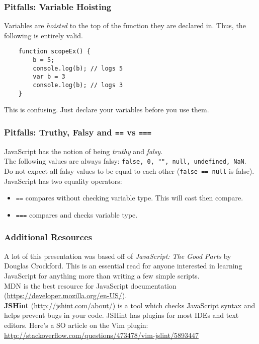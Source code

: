 \documentclass{lug}
\begin{document}
\begin{frame}[fragile]
    \frametitle{Pitfalls: Variable Hoisting}

    Variables are \textit{hoisted} to the top of the function they are declared in. Thus, the
    following is entirely valid.

    \begin{verbatim}
    function scopeEx() {
        b = 5;
        console.log(b); // logs 5
        var b = 3
        console.log(b); // logs 3
    }
    \end{verbatim}

    This is confusing. Just declare your variables before you use them.

\end{frame}

\begin{frame}
    \frametitle{Pitfalls: Truthy, Falsy and \texttt{==} vs \texttt{===}}

    JavaScript has the notion of being \textit{truthy} and \textit{falsy}.\\

    The following values are always falsy: \texttt{false, 0, "", null, undefined, NaN}. \\

    Do not expect all falsy values to be equal to each other (\texttt{false == null} is false). \\

    JavaScript has two equality operators:
    \begin{itemize}
        \item \texttt{==} compares without checking variable type. This will cast then compare.
        \item \texttt{===} compares and checks variable type.
    \end{itemize}
\end{frame}

\begin{frame}
    \frametitle{Additional Resources}

    A lot of this presentation was based off of \textit{JavaScript: The Good Parts} by Douglas
    Crockford. This is an essential read for anyone interested in learning JavaScript for anything
    more than writing a few simple scripts.\\

    MDN is the best resource for JavaScript documentation
    (\url{https://developer.mozilla.org/en-US/}). \\

    \textbf{JSHint} (\url{http://jshint.com/about/}) is a tool which checks JavaScript syntax and
    helps prevent bugs in your code. JSHint has plugins for most IDEs and text editors. Here's a SO
    article on the Vim plugin: \url{http://stackoverflow.com/questions/473478/vim-jslint/5893447}\\

\end{frame}
\end{document}
